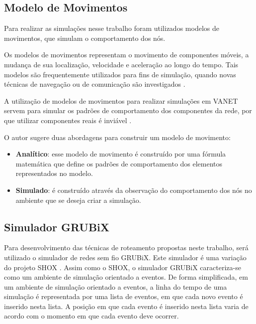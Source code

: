 \subsection{Modelo de Movimentos}

Para realizar as simulações nesse trabalho foram utilizados modelos de movimentos, que simulam o comportamento dos nós.

Os modelos de movimentos representam o movimento de componentes móveis, a mudança de sua localização, velocidade e aceleração ao longo do tempo. Tais modelos são frequentemente utilizados para fins de simulação, quando novas técnicas de navegação ou de comunicação são investigados \cite{Nichols:2007}. 

A utilização de modelos de movimentos para realizar simulações em VANET servem para simular os padrões de comportamento dos componentes da rede, por que utilizar componentes reais é inviável \cite{Freitas:2011}.

O autor \cite{Sun:2002} sugere duas abordagens para construir um modelo de movimento:

\begin{itemize}
\item \textbf{Analítico}: esse modelo de movimento é construído por uma fórmula matemática que define os padrões de comportamento dos elementos representados no modelo. 

\item \textbf{Simulado}: é construído através da observação do comportamento dos nós no ambiente que se deseja criar a simulação.

\end{itemize}

\subsection{Simulador GRUBiX}

Para desenvolvimento das técnicas de roteamento propostas neste trabalho, será utilizado o simulador de redes sem fio GRUBiX. Este simulador é uma variação do projeto SHOX \cite{Lessmann:2008}. Assim como o SHOX, o simulador GRUBiX caracteriza-se como um ambiente de simulação orientado a eventos. De forma simplificada, em um ambiente de simulação orientado a eventos, a linha do tempo de uma simulação é representada por uma lista de eventos, em que cada novo evento é inserido nesta lista. A posição em que cada evento é inserido nesta lista varia de acordo com o momento em que cada evento deve ocorrer.

